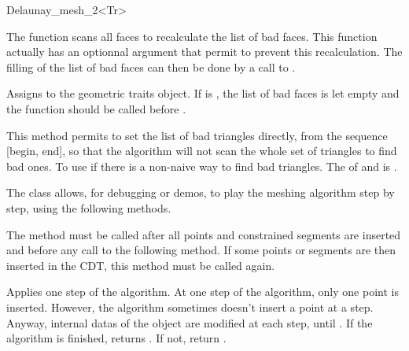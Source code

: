 \begin{ccRefClass}{Delaunay_mesh_2<Tr>}
\begin{ccAdvanced}
  The function  scans all faces to recalculate the
  list of bad faces. This function actually has an optionnal argument that
  permit to prevent this recalculation. The filling of the list of bad
  faces can then be done by a call to .
  
  { Assigns  to the geometric traits object. If
     is , the list of bad faces is
    let empty and the function  should be called before
    .}

                   { This method permits to set the list of bad triangles
                     directly, from the sequence [begin, end], so that the
                     algorithm will not scan the whole set of triangles to
                     find bad ones. To use if there is a non-naive way to
                     find bad triangles.  \ccPrecond The 
                     of  and  is .}

\end{ccAdvanced}


\begin{ccAdvanced}

The \ccRefName{} class allows, for debugging or demos, to play the
meshing algorithm step by step, using the following methods.

         { The method must be called after all points and constrained
           segments are inserted and before any call to the following
           method. If some points or segments are then inserted 
           in the CDT, this method must be called again. }

         { Applies one step of the algorithm. At one step of the algorithm,
           only one point is inserted. However, the algorithm
           sometimes doesn't insert a point at a step. Anyway,
           internal datas of the \ccRefName{} object are modified at
           each step, until . If the algorithm
           is finished, returns . If not, return
           .}

\end{ccAdvanced}

\end{ccRefClass}

